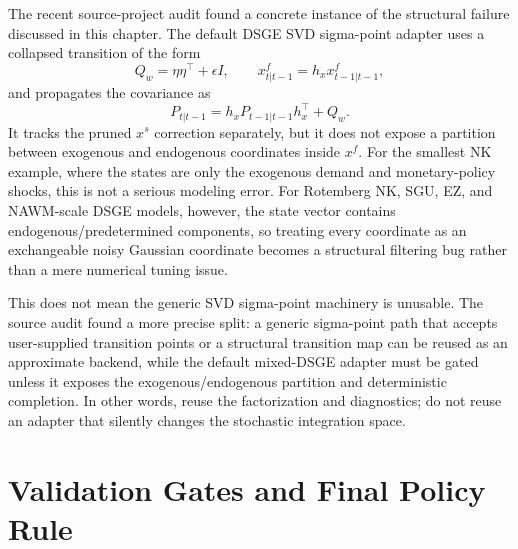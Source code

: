 The recent source-project audit found a concrete instance of the structural
failure discussed in this chapter.  The default DSGE SVD sigma-point adapter
uses a collapsed transition of the form
\[
  Q_w = \eta\eta^\top + \epsilon I,\qquad
  x_{t|t-1}^f = h_x x_{t-1|t-1}^f,
\]
and propagates the covariance as
\[
  P_{t|t-1} = h_x P_{t-1|t-1} h_x^\top + Q_w.
\]
It tracks the pruned $x^s$ correction separately, but it does not expose a
partition between exogenous and endogenous coordinates inside $x^f$.  For the
smallest NK example, where the states are only the exogenous demand and
monetary-policy shocks, this is not a serious modeling error.  For Rotemberg NK,
SGU, EZ, and NAWM-scale DSGE models, however, the state vector contains
endogenous/predetermined components, so treating every coordinate as an
exchangeable noisy Gaussian coordinate becomes a structural filtering bug rather
than a mere numerical tuning issue.

This does not mean the generic SVD sigma-point machinery is unusable.  The
source audit found a more precise split: a generic sigma-point path that accepts
user-supplied transition points or a structural transition map can be reused as
an approximate backend, while the default mixed-DSGE adapter must be gated
unless it exposes the exogenous/endogenous partition and deterministic
completion.  In other words, reuse the factorization and diagnostics; do not
reuse an adapter that silently changes the stochastic integration space.

\section{Validation Gates and Final Policy Rule}
\label{sec:bf-structural-deterministic-required-tests}

